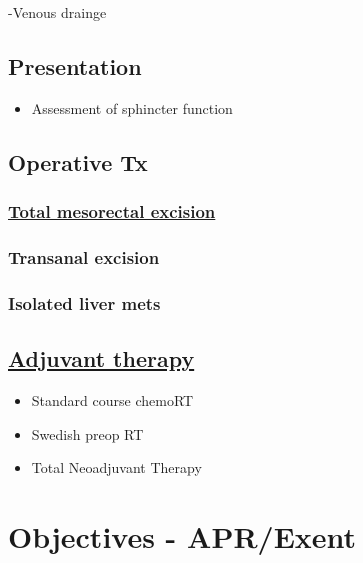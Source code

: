 \documentclass[
]{book}
\providecommand{\tightlist}{%
  \setlength{\itemsep}{0pt}\setlength{\parskip}{0pt}}
\begin{document}
-Venous drainge

\hypertarget{presentation}{%
\section{Presentation}\label{presentation}}

\begin{itemize}
\tightlist
\item
  Assessment of sphincter function
\end{itemize}

\hypertarget{operative-tx}{%
\section{Operative Tx}\label{operative-tx}}

\hypertarget{total-mesorectal-excision}{%
\subsection{\texorpdfstring{\href{767-rectal_surgery.html}{Total mesorectal excision}}{Total mesorectal excision}}\label{total-mesorectal-excision}}

\hypertarget{transanal-excision}{%
\subsection{Transanal excision}\label{transanal-excision}}

\hypertarget{isolated-liver-mets}{%
\subsection{Isolated liver mets}\label{isolated-liver-mets}}

\hypertarget{adjuvant-therapy}{%
\section{\texorpdfstring{\href{770-rectal_RT.html}{Adjuvant therapy}}{Adjuvant therapy}}\label{adjuvant-therapy}}

\begin{itemize}
\tightlist
\item
  Standard course chemoRT
\item
  Swedish preop RT
\item
  Total Neoadjuvant Therapy
\end{itemize}

\hypertarget{objectives---aprexent}{%
\chapter{Objectives - APR/Exent}\label{objectives---aprexent}}
\end{document}
